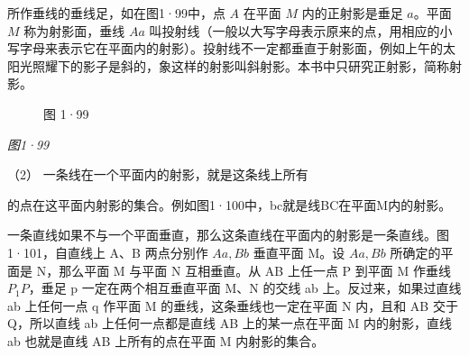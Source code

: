 所作垂线的垂线足，如在图1·99中，点 \(A\) 在平面 \(M\) 内的正射影是垂足
\(a\)。平面 \(M\) 称为射影面，垂线 \(Aa\)
叫投射线（一般以大写字母表示原来的点，用相应的小写字母来表示它在平面内的射影）。投射线不一定都垂直于射影面，例如上午的太阳光照耀下的影子是斜的，象这样的射影叫斜射影。本书中只研究正射影，简称射影。

\begin{figure}
\centering
{}
\caption{图 1·99}
\end{figure}

\emph{图1·99}

（2） 一条线在一个平面内的射影，就是这条线上所有

的点在这平面内射影的集合。例如图1·100中，bc就是线BC在平面M内的射影。

一条直线如果不与一个平面垂直，那么这条直线在平面内的射影是一条直线。图1·101，自直线上
A、B 两点分别作 \(Aa, Bb\) 垂直平面 M。设 \(Aa, Bb\) 所确定的平面是
N，那么平面 M 与平面 N 互相垂直。从 AB 上任一点 P 到平面 M 作垂线
\(P_{1}P\)，垂足 p 一定在两个相互垂直平面 M、N 的交线 ab
上。反过来，如果过直线 ab 上任何一点 q 作平面 M
的垂线，这条垂线也一定在平面 N 内，且和 AB 交于 Q，所以直线 ab
上任何一点都是直线 AB 上的某一点在平面 M 内的射影，直线 ab 也就是直线 AB
上所有的点在平面 M 内射影的集合。

